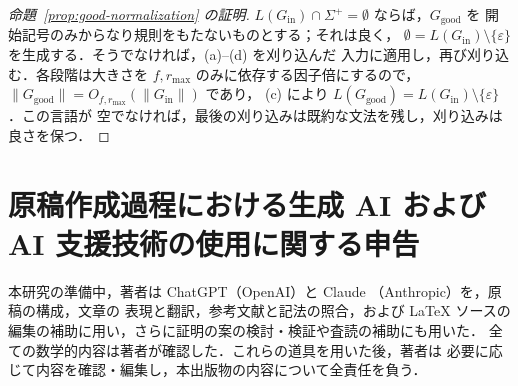 \documentclass[11pt,a4paper]{ltjsarticle}
\numberwithin{equation}{section}
\theoremstyle{plain}
\theoremstyle{definition}
\theoremstyle{remark}
\newcommand{\eps}{\varepsilon}
\theoremstyle{plain}
\begin{document}
\begin{proof}[命題~\ref{prop:good-normalization} の証明]
$L(G_{\mathrm{in}})\cap\Sigma^+=\emptyset$ ならば，$G_{\mathrm{good}}$ を
開始記号のみからなり規則をもたないものとする；それは良く，
$\emptyset=L(G_{\mathrm{in}})\setminus\{\eps\}$ を生成する．そうでなければ，(a)--(d) を刈り込んだ
入力に適用し，再び刈り込む．各段階は大きさを
$f,r_{\max}$ のみに依存する因子倍にするので，
$\|G_{\mathrm{good}}\|=O_{f,r_{\max}}(\|G_{\mathrm{in}}\|)$ であり，
(c) により $L(G_{\mathrm{good}})=L(G_{\mathrm{in}})\setminus\{\eps\}$．この言語が
空でなければ，最後の刈り込みは既約な文法を残し，刈り込みは良さを保つ．
\end{proof}


\section*{原稿作成過程における生成 AI および AI 支援技術の使用に関する申告}
本研究の準備中，著者は ChatGPT（OpenAI）と Claude
（Anthropic）を，原稿の構成，文章の
表現と翻訳，参考文献と記法の照合，および
\LaTeX{} ソースの編集の補助に用い，さらに証明の案の検討・検証や査読の補助にも用いた．
全ての数学的内容は著者が確認した．これらの道具を用いた後，著者は
必要に応じて内容を確認・編集し，本出版物の内容について全責任を負う．
\end{document}
